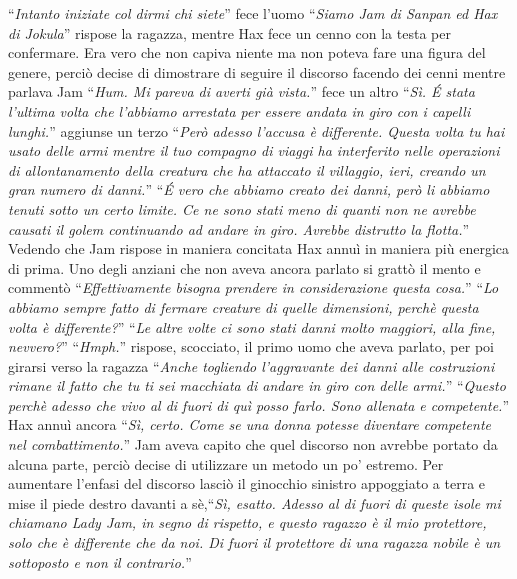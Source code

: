     ``\emph{Intanto iniziate col dirmi chi siete}'' fece l'uomo
    ``\emph{Siamo Jam di Sanpan ed Hax di Jokula}'' rispose la ragazza,
    mentre Hax fece un cenno con la testa per confermare. Era vero che non
    capiva niente ma non poteva fare una figura del genere, perciò decise
    di dimostrare di seguire il discorso facendo dei cenni mentre parlava
    Jam ``\emph{Hum. Mi pareva di averti già vista.}'' fece un altro
    ``\emph{Sì. \'E stata l'ultima volta che l'abbiamo arrestata per essere
    andata in giro con i capelli lunghi.}'' aggiunse un terzo ``\emph{Però
    adesso l'accusa è differente. Questa volta tu hai usato delle armi
    mentre il tuo compagno di viaggi ha interferito nelle operazioni di
    allontanamento della creatura che ha attaccato il villaggio, ieri,
    creando un gran numero di danni.}'' ``\emph{\'E vero che abbiamo creato
    dei danni, però li abbiamo tenuti sotto un certo limite. Ce ne sono
    stati meno di quanti non ne avrebbe causati il golem continuando ad
    andare in giro. Avrebbe distrutto la flotta.}'' Vedendo che Jam rispose
    in maniera concitata Hax annuì in maniera più energica di prima. Uno degli anziani che
    non aveva ancora parlato si grattò il mento e commentò
    ``\emph{Effettivamente bisogna prendere in considerazione questa
    cosa.}'' ``\emph{Lo abbiamo sempre fatto di fermare creature di quelle
    dimensioni, perchè questa volta è differente?}'' ``\emph{Le altre volte
    ci sono stati danni molto maggiori, alla fine, nevvero?}''
    ``\emph{Hmph.}'' rispose, scocciato, il primo uomo che aveva parlato,
    per poi girarsi verso la ragazza ``\emph{Anche togliendo l'aggravante
    dei danni alle costruzioni rimane il fatto che tu ti sei macchiata di
    andare in giro con delle armi.}'' ``\emph{Questo perchè adesso che vivo
    al di fuori di quì posso farlo. Sono allenata e competente.}'' Hax
    annuì ancora ``\emph{Sì, certo. Come se una donna potesse diventare
    competente nel combattimento.}'' Jam aveva capito che quel discorso non
    avrebbe portato da alcuna parte, perciò decise di utilizzare un metodo
    un po' estremo. Per aumentare l'enfasi del discorso lasciò il ginocchio
    sinistro appoggiato a terra e mise il piede destro davanti a
    sè,``\emph{Sì, esatto. Adesso al di fuori di queste isole
    mi chiamano \emph{Lady} Jam, in segno di rispetto, e questo ragazzo è il
    mio protettore, solo che è differente che da noi. Di fuori il
    protettore di una ragazza nobile è un sottoposto e non il contrario.}''

